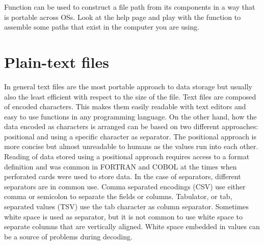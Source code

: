 \documentclass[krantz2]{krantz}\usepackage{knitr}%
\begin{document}
\begin{playground}
Function  can be used to construct a file path from its components in a way that is portable across OSs. Look at the help page and play with the function to assemble some paths that exist in the computer you are using.
\end{playground}

\section{Plain-text files}\label{sec:files:txt}
In general text files are the most portable approach to data storage but usually also the least efficient with respect to the size of the file. Text files are composed of encoded characters. This makes them easily readable with text editors and easy to use functions in any programming language. On the other hand, how the data encoded as characters is arranged can be based on two different approaches: positional and using a specific character as separator. The positional approach is more concise but almost unreadable to humans as the values run into each other. Reading of data stored using a positional approach requires access to a format definition and was common in FORTRAN and COBOL at the times when perforated cards were used to store data. In the case of separators, different separators are in common use. Comma separated encodings (CSV) use either comma or semicolon to separate the fields or columns. Tabulator, or tab, separated values (TSV) use the tab character as column separator. Sometimes white space is used as separator, but it is not common to use white space to separate columns that are vertically aligned. White space embedded in values can be a source of problems during decoding.
\end{document}
